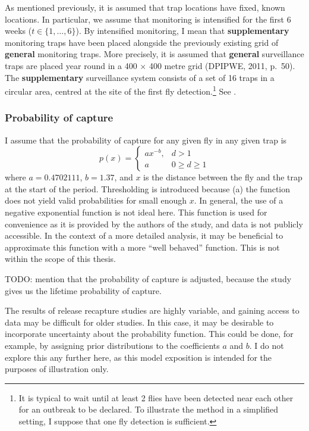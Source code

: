 \documentclass[
  oneside]{book}
\begin{document}
As mentioned previously, it is assumed that trap locations have fixed, known locations. In particular, we assume that monitoring is intensified for the first 6 weeks (\(t \in \{1, \ldots, 6\}\)). By intensified monitoring, I mean that \textbf{supplementary} monitoring traps have been placed alongside the previously existing grid of \textbf{general} monitoring traps. More precisely, it is assumed that \textbf{general} surveillance traps are placed year round in a 400 \(\times\) 400 metre grid (DPIPWE, 2011, p.~50). The \textbf{supplementary} surveillance system consists of a set of 16 traps in a circular area, centred at the site of the first fly detection.\footnote{It is typical to wait until at least 2 flies have been detected near each other for an outbreak to be declared. To illustrate the method in a simplified setting, I suppose that one fly detection is sufficient.} See \citet{trapgrid}.

\hypertarget{probability-of-capture}{%
\subsubsection{Probability of capture}\label{probability-of-capture}}

I assume that the probability of capture for any given fly in any given trap is
\[
p(x) = \begin{cases}ax^{-b}, & d>1 \\ a & 0 \geq d \geq 1\end{cases}
\]
where \(a = 0.4702111\), \(b = 1.37\), and \(x\) is the distance between the fly and the trap at the start of the period. Thresholding is introduced because (a) the function does not yield valid probabilities for small enough \(x\). In general, the use of a negative exponential function is not ideal here. This function is used for convenience as it is provided by the authors of the study, and data is not publicly accessible. In the context of a more detailed analysis, it may be beneficial to approximate this function with a more ``well behaved'' function. This is not within the scope of this thesis.

TODO: mention that the probability of capture is adjusted, because the study gives us the lifetime probability of capture.

The results of release recapture studies are highly variable, and gaining access to data may be difficult for older studies. In this case, it may be desirable to incorporate uncertainty about the probability function. This could be done, for example, by assigning prior distributions to the coefficients \(a\) and \(b\). I do not explore this any further here, as this model exposition is intended for the purposes of illustration only.
\end{document}
